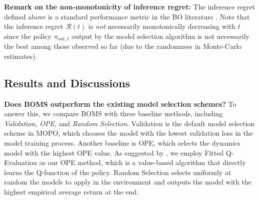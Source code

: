 \vspace{1mm}
\noindent\textbf{Remark on the non-monotonicity of inference regret:} The inference regret defined above is a standard performance metric in the BO literature \citep{wang2017max,hvarfner2022joint,li2020multi}. Note that the inference regret $\mathcal{R}(t)$ is \textit{not} necessarily monotonically decreasing with $t$ since the policy $\pi_{\text{out},t}$ output by the model selection algorithm is not necessarily the best among those observed so far (due to the randomness in Monte-Carlo estimates).


\vspace{-1mm}

\subsection{Results and Discussions}
\vspace{-1mm}

\noindent\textbf{{Does BOMS outperform the existing model selection schemes?}}
To answer this, we compare BOMS with three baseline methods, including \textit{Validation}, \textit{OPE}, and \textit{Random Selection}. Validation is the default model selection scheme in MOPO, which chooses the model with the lowest validation loss in the model training process. Another baseline is OPE, which selects the dynamics model with the highest OPE value. As suggested by \citep{tang2021model}, we employ Fitted Q-Evaluation \citep{le2019batch} as our OPE method, which is a value-based algorithm that directly learns the Q-function of the policy. Random Selection selects uniformly at random the models to apply in the environment and outputs the model with the highest empirical average return at the end. 


